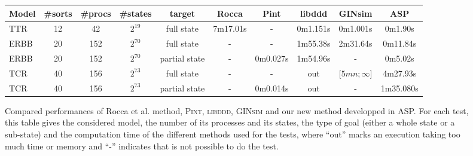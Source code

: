 \begin{figure}[htp]
\begin{center}
\label{tab:reachability}
\noindent%
\begin{tabular}{|l|c|c|c|c||c|c|c|c|c|}
  \hline
   Model&  \#sorts &\#procs & \#states & target & Rocca & Pint & libddd & GINsim & ASP \\
  \hline
  TTR & 12 &42 & $2^{19}$ & full state & 7m17.01s & - & 0m1.151s &  0m1.001s & 0m1.90s \\
  \hline
  ERBB & 20 &152 & $2^{70}$ & full state & - & - &1m55.38s & 2m31.64s & 0m11.84s \\
  \hline
  ERBB & 20 &152 & $2^{70}$ & partial state & - & 0m0.027s &1m54.96s & - & 0m5.02s \\
  \hline
  TCR & 40 &156 & $2^{73}$ & full state & - & - & out & $ \lbrack 5mn ; \infty \rbrack$ & 4m27.93s \\
  \hline
   TCR & 40 &156 & $2^{73}$ & partial state & - & 0m0.014s & out & - & 1m35.080s \\
  \hline
\end{tabular}
\caption{Compared performances of Rocca et al. method, \textsc{Pint}, \textsc{libddd}, \textsc{GINsim} and our new method developped in ASP.
For each test, this table gives the considered model,
the number of its processes and its states, the type of goal
(either a whole state or a sub-state)
and the computation time of the different methods used for the tests,
where “out” marks an execution taking too much time or memory
and “-” indicates that is not possible to do the test.
}
\end{center}
\end{figure}


 

